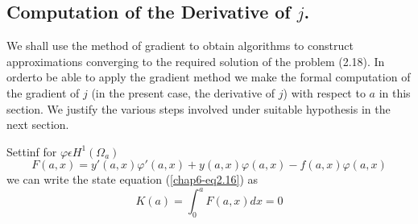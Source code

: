 \subsection{Computation of the Derivative of $j$.}

We shall use the method of gradient to obtain algorithms to construct
approximations converging to the required solution of the problem
(2.18). In order\pageoriginale to be able to apply the gradient method
we make the formal computation of the gradient of $j$ (in the present
case, the derivative of $j$) with respect to $a$ in this section. We
justify the various steps involved under suitable hypothesis in the
next section. 

Settinf for $\varphi \epsilon H^{1} (\Omega_{a})$
\begin{equation*}
F(a, x) = y' (a, x) \varphi' (a, x) + y(a, x) \varphi (a, x) - f(a, x)
\varphi (a, x)\tag{2.20}\label{chap6-eq2.20} 
\end{equation*}
we can write the state equation (\ref{chap6-eq2.16}) as
\begin{equation*}
K(a) = \int_{0}^{a} F(a, x) dx = 0\tag{2.21}\label{chap6-eq2.21}
\end{equation*}

